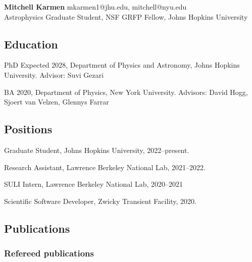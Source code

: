 \documentclass[12pt,letterpaper]{article}
\begin{document}
\thispagestyle{empty}\sloppy\sloppypar\raggedbottom

\textbf{\Large Mitchell Karmen} \hfill
\textsf{\small mkarmen1@jhu.edu, mitchell@nyu.edu} \\[0.5ex]
Astrophysics Graduate Student, NSF GRFP Fellow, Johns Hopkins University\\[0.5ex]

\subsection{Education}
\begin{list}{}{\cvlist}
  \item
        PhD Expected 2028, Department of Physics and Astronomy, Johns Hopkins University. Advisor: Suvi Gezari
  
  \item
        BA 2020, Department of Physics, New York University. Advisors: David Hogg, Sjoert van Velzen, Glennys Farrar
\end{list}

\subsection{Positions}
\begin{list}{}{\cvlist}
  \item
        Graduate Student, Johns Hopkins University, 2022--present.
  \item
        Research Assistant, Lawrence Berkeley National Lab, 2021--2022. %
  \item
        SULI Intern, Lawrence Berkeley National Lab, 2020--2021
  \item
        Scientific Software Developer, Zwicky Transient Facility, 2020.
\end{list}


\subsection{Publications}
% 

\subsubsection{Refereed publications}
\begin{list}{}{\cvlist}

\end{list}
\end{document}

